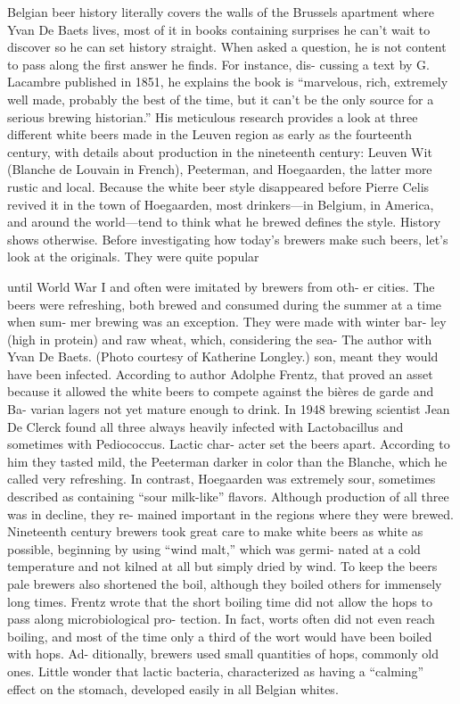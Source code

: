 \documentclass[a4paper,parskip=half]{scrartcl}
\begin{document}
\parencite[37]{Hieronymus2010}
Belgian beer history literally covers the walls of the Brussels apartment where
Yvan De Baets lives, most of it in books containing surprises he can’t
wait to discover so he can set history straight. When asked a question,
he is not content to pass along the first answer he finds. For instance, dis-
cussing a text by G. Lacambre published in 1851, he explains the book
is “marvelous, rich, extremely well made, probably the best of the time,
but it can’t be the only source for a serious brewing historian.”
His meticulous research provides a look at three different white
beers made in the Leuven region as early as the fourteenth century, with
details about production in the nineteenth century: Leuven Wit (Blanche
de Louvain in French), Peeterman, and Hoegaarden, the latter more rustic
and local.
Because the white beer style disappeared before Pierre Celis revived
it in the town of Hoegaarden, most drinkers—in Belgium, in America,
and around the world—tend to think what he brewed defines the style.
History shows otherwise. Before investigating how today’s brewers
make such beers, let’s look at the originals. They were quite popular




\parencite[38]{Hieronymus2010}

until World War I and
often were imitated
by brewers from oth-
er cities. The beers
were refreshing, both
brewed and consumed
during the summer
at a time when sum-
mer brewing was an
exception. They were
made with winter bar-
ley (high in protein)
and raw wheat, which,
considering the sea-
The author with Yvan De Baets. (Photo courtesy of Katherine Longley.)
son, meant they would
have been infected.
According to author Adolphe Frentz, that proved an asset because it
allowed the white beers to compete against the bières de garde and Ba-
varian lagers not yet mature enough to drink.
In 1948 brewing scientist Jean De Clerck found all three always heavily
infected with Lactobacillus and sometimes with Pediococcus. Lactic char-
acter set the beers apart. According to him they tasted mild, the Peeterman
darker in color than the Blanche, which he called very refreshing. In contrast,
Hoegaarden was extremely sour, sometimes described as containing “sour
milk-like” flavors. Although production of all three was in decline, they re-
mained important in the regions where they were brewed.
Nineteenth century brewers took great care to make white beers as
white as possible, beginning by using “wind malt,” which was germi-
nated at a cold temperature and not kilned at all but simply dried by
wind. To keep the beers pale brewers also shortened the boil, although
they boiled others for immensely long times. Frentz wrote that the short
boiling time did not allow the hops to pass along microbiological pro-
tection. In fact, worts often did not even reach boiling, and most of the
time only a third of the wort would have been boiled with hops. Ad-
ditionally, brewers used small quantities of hops, commonly old ones.
Little wonder that lactic bacteria, characterized as having a “calming”
effect on the stomach, developed easily in all Belgian whites.
\end{document}
